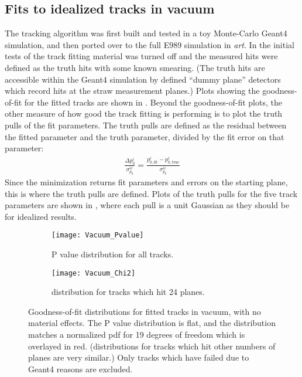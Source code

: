 \subsection{Fits to idealized tracks in vacuum}


The tracking algorithm was first built and tested in a toy Monte-Carlo Geant4 simulation, and then ported over to the full E989 simulation in \textit{art}. In the initial tests of the track fitting material was turned off and the measured hits were defined as the truth hits with some known smearing. (The truth hits are accessible within the Geant4 simulation by defined ``dummy plane'' detectors which record hits at the straw measurement planes.) Plots showing the goodness-of-fit for the fitted tracks are shown in . Beyond the goodness-of-fit plots, the other measure of how good the track fitting is performing is to plot the truth pulls of the fit parameters. The truth pulls are defined as the residual between the fitted parameter and the truth parameter, divided by the fit error on that parameter:
    \begin{align}
        \frac{\Delta p^{i}_{0}}{\sigma_{p_{0}}^{ii}} = \frac{p^{i}_{0, \text{fit}} - p^{i}_{0, \text{true}}}{\sigma_{p_{0}}^{ii}}
    \end{align}
Since the \chisq minimization returns fit parameters and errors on the starting plane, this is where the truth pulls are defined. Plots of the truth pulls for the five track parameters are shown in , where each pull is a unit Gaussian as they should be for idealized results.



    \begin{figure}[]
    \centering
        \begin{subfigure}[t]{0.45\textwidth}
            \centering
            \texttt{[image: Vacuum\_Pvalue]}
            \caption{P value distribution for all tracks.}
        \end{subfigure}
        \begin{subfigure}[t]{0.45\textwidth}
            \centering
            \texttt{[image: Vacuum\_Chi2]}
            \caption{\chisq distribution for tracks which hit 24 planes.}
        \end{subfigure}
    \caption[P value and \chisq distribution for fitted tracks in vacuum]{Goodness-of-fit distributions for fitted tracks in vacuum, with no material effects. The P value distribution is flat, and the \chisq distribution matches a normalized \chisq pdf for 19 degrees of freedom which is overlayed in red. (\chisq distributions for tracks which hit other numbers of planes are very similar.) Only tracks which have failed due to Geant4 reasons are excluded.}
    \label{fig:VacuumGoodnessOfFit}
    \end{figure}

